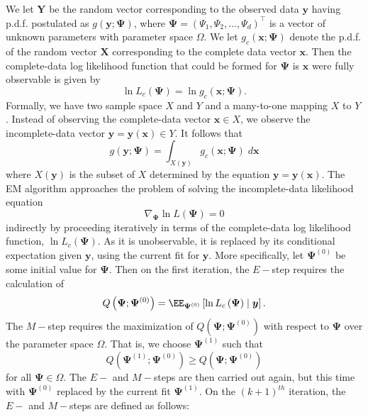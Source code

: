 We let $\bm{Y}$ be the random vector corresponding to the observed data $\bm{y}$ having p.d.f. postulated as $g(\bm{y} ; \bm{\Psi})$, where $\bm{\Psi} = \left( \Psi_1 , \Psi_2 , \ldots , \Psi_d \right)^{\intercal}$ is a vector of unknown parameters with parameter space $\Omega$. We let $g_c (\bm{x};\bm{\Psi})$ denote the p.d.f. of the random vector $\bm{X}$ corresponding to the complete data vector $\bm{x}$. Then the complete-data log likelihood function that could be formed for $\bm{\Psi}$ is $\bm{x}$ were fully observable is given by
\begin{equation*}
    \ln L_{c} (\bm{\Psi}) = \ln g_c (\bm{x} ; \bm{\Psi}).
\end{equation*}
Formally, we have two sample space $X$ and $Y$ and a many-to-one mapping $X$ to $Y$. Instead of observing the complete-data vector $\bm{x} \in X$, we observe the incomplete-data vector $\bm{y} = \bm{y} (\bm{x}) \in Y$. It follows that
\begin{equation*}
    g (\bm{y} ; \bm{\Psi}) = \int_{X(\bm{y})} g_c (\bm{x}; \bm{\Psi}) \; d \bm{x}
\end{equation*}
where $X(\bm{y})$ is the subset of $X$ determined by the equation $\bm{y} = \bm{y} (\bm{x})$. The EM algorithm approaches the problem of solving the incomplete-data likelihood equation
\begin{equation*}
    \nabla_{\bm{\Psi}} \ln L (\bm{\Psi}) = 0
\end{equation*}
indirectly by proceeding iteratively in terms of the complete-data log likelihood function, $\ln L_c (\bm{\Psi})$. As it is unobservable, it is replaced by its conditional expectation given $\bm{y}$, using the current fit for $\bm{y}$. More specifically, let $\bm{\Psi}^{(0)}$ be some initial value for $\bm{\Psi}$. Then on the first iteration, the $E-$step requires the calculation of
\begin{equation*}
    Q \left( \bm{\Psi} ; \bm{\Psi}^{(0)} \right) = \EE_{\bm{\Psi}^{(0)}} \left[ \ln L_c \left( \bm{\Psi} \right) \mid \bm{y} \right].
\end{equation*}
The $M-$step requires the maximization of $Q \left( \bm{\Psi} ; \bm{\Psi}^{(0)} \right)$ with respect to $\bm{\Psi}$ over the parameter space $\Omega$. That is, we choose $\bm{\Psi}^{(1)}$ such that
\begin{equation*}
    Q \left( \bm{\Psi}^{(1)} ; \bm{\Psi}^{(0)} \right) \geq Q \left( \bm{\Psi} ; \bm{\Psi}^{(0)} \right)
\end{equation*}
for all $\bm{\Psi} \in \Omega$. The $E-$ and $M-$steps are then carried out again, but this time with $\bm{\Psi}^{(0)}$ replaced by the current fit $\bm{\Psi}^{(1)}$. On the $(k+1)^{th}$ iteration, the $E-$ and $M-$steps are defined as follows:

